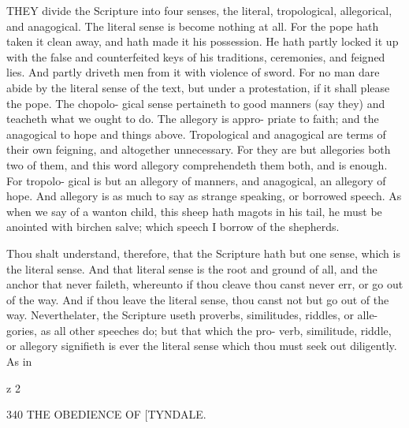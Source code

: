 \documentclass{custom}
\begin{document}
{THEY divide the Scripture into four senses, the literal, 
tropological, allegorical, and anagogical. The literal 
sense is become nothing at all. For the pope hath taken 
it clean away, and hath made it his possession. He hath 
partly locked it up with the false and counterfeited keys 
of his traditions, ceremonies, and feigned lies. And partly 
driveth men from it with violence of sword. For no man 
dare abide by the literal sense of the text, but under a 
protestation, if it shall please the pope. The chopolo- 
gical sense pertaineth to good manners (say they) and 
teacheth what we ought to do. The allegory is appro- 
priate to faith; and the anagogical to hope and things 
above. Tropological and anagogical are terms of their 
own feigning, and altogether unnecessary. For they are 
but allegories both two of them, and this word allegory 
comprehendeth them both, and is enough. For tropolo- 
gical is but an allegory of manners, and anagogical, an 
allegory of hope. And allegory is as much to say as
strange speaking, or borrowed speech. As when we say
of a wanton child, this sheep hath magots in his tail, he 
must be anointed with birchen salve; which speech I 
borrow of the shepherds. 

Thou shalt understand, therefore, that the Scripture hath
but one sense, which is the literal sense. And that literal
sense is the root and ground of all, and the anchor that never
faileth, whereunto if thou cleave thou canst never err, or 
go out of the way. And if thou leave the literal sense, 
thou canst not but go out of the way. Neverthelater, 
the Scripture useth proverbs, similitudes, riddles, or alle- 
gories, as all other speeches do; but that which the pro- 
verb, similitude, riddle, or allegory signifieth is ever the 
literal sense which thou must seek out diligently. As in 

z 2 


340
THE OBEDIENCE OF
[TYNDALE.

}
\end{document}
